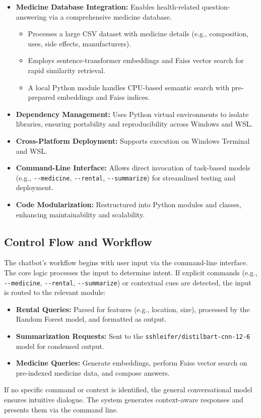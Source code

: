 \documentclass[a4paper,10pt,conference]{IEEEtran}
\begin{document}
\begin{itemize}
    \item \textbf{Medicine Database Integration:} Enables health-related question-answering via a comprehensive medicine database.
    \begin{itemize}
        \item Processes a large CSV dataset with medicine details (e.g., composition, uses, side effects, manufacturers).
        \item Employs sentence-transformer embeddings and Faiss vector search for rapid similarity retrieval.
        \item A local Python module handles CPU-based semantic search with pre-prepared embeddings and Faiss indices.
    \end{itemize}
    \item \textbf{Dependency Management:} Uses Python virtual environments to isolate libraries, ensuring portability and reproducibility across Windows and WSL.
    \item \textbf{Cross-Platform Deployment:} Supports execution on Windows Terminal and WSL.
    \item \textbf{Command-Line Interface:} Allows direct invocation of task-based models (e.g., \texttt{-{}-medicine}, \texttt{-{}-rental}, \texttt{-{}-summarize}) for streamlined testing and deployment.
    \item \textbf{Code Modularization:} Restructured into Python modules and classes, enhancing maintainability and scalability.
\end{itemize}

\subsection{Control Flow and Workflow}
The chatbot’s workflow begins with user input via the command-line interface. The core logic processes the input to determine intent. If explicit commands (e.g., \texttt{-{}-medicine}, \texttt{-{}-rental}, \texttt{-{}-summarize}) or contextual cues are detected, the input is routed to the relevant module:
\begin{itemize}
    \item \textbf{Rental Queries:} Parsed for features (e.g., location, size), processed by the Random Forest model, and formatted as output.
    \item \textbf{Summarization Requests:} Sent to the \texttt{sshleifer/distilbart-cnn-12-6} model for condensed output.
    \item \textbf{Medicine Queries:} Generate embeddings, perform Faiss vector search on pre-indexed medicine data, and compose answers.
\end{itemize}
If no specific command or context is identified, the general conversational model ensures intuitive dialogue. The system generates context-aware responses and presents them via the command line.
\end{document}
